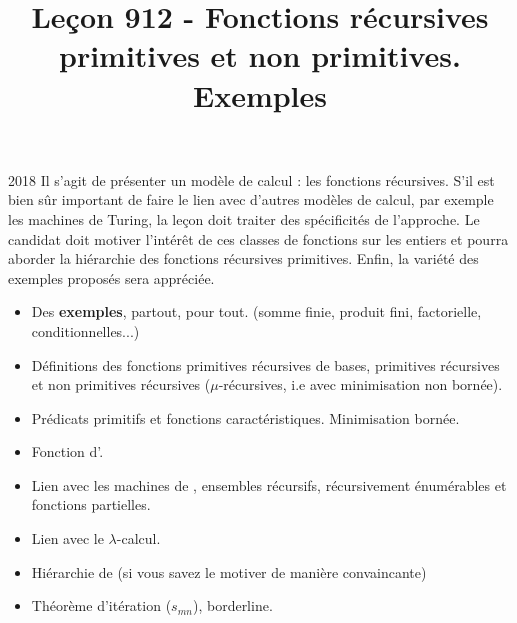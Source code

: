 \documentclass{agregfiche}
\title{Leçon 912 - Fonctions récursives primitives et non primitives. Exemples}
\begin{document}
\maketitle

\secrapports
\begin{rapport}{2018}
	Il s’agit de présenter un modèle de calcul : les fonctions récursives. S’il est bien sûr important de faire
	le lien avec d’autres modèles de calcul, par exemple les machines de Turing, la leçon doit traiter des
	spécificités de l’approche. Le candidat doit motiver l’intérêt de ces classes de fonctions sur les entiers et
	pourra aborder la hiérarchie des fonctions récursives primitives. Enfin, la variété des exemples proposés
	sera appréciée.
\end{rapport}

\secindispensables

\begin{itemize}
	\item Des \textbf{exemples}, partout, pour tout. (somme finie, produit fini, factorielle, conditionnelles...) 
	\item Définitions des fonctions primitives récursives de bases, primitives récursives et non primitives récursives ($\mu$-récursives, i.e avec minimisation non bornée).
	\item Prédicats primitifs et fonctions caractéristiques. Minimisation bornée.
  
\end{itemize}

\secasavoir

\begin{itemize}
	\item Fonction d'.
	\item Lien avec les machines de , ensembles récursifs, récursivement énumérables et fonctions partielles.
\end{itemize}


\secidees

\begin{itemize}
	\item Lien avec le $\lambda$-calcul.
	\item Hiérarchie de  (si vous savez le motiver de manière convaincante)
	\item Théorème d'itération ($s_{mn}$), borderline.
\end{itemize}

\secpieges
\end{document}
